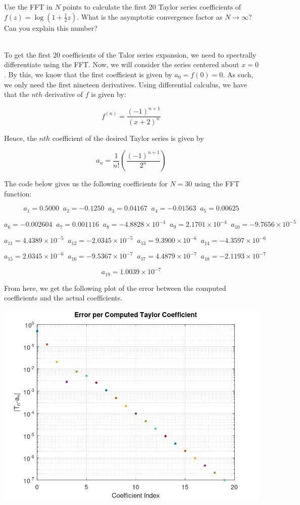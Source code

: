 Use the FFT in $N$ points to calculate the first 20 Taylor series coefficients of 
$f(z) = \log(1 + \frac12z)$. What is the asymptotic convergence factor as $N\rightarrow\infty$? 
Can you explain this number?\\

\begin{solution}\renewcommand{\qedsymbol}{}\ \\
    To get the first 20 coefficients of the Talor series expansion, we need to spectrally differentiate
    using the FFT. Now, we will consider the series centered about $x=0$. By this, we know that the
    first coefficient is given by $a_0=f(0)=0$. As such, we only need the first nineteen derivatives.
    Using differential calculus, we have that the $nth$ derivative of $f$ is given by:

    $$f^{(n)}=\frac{(-1)^{n+1}}{(x+2)^n}$$

    Hence, the $nth$ coefficient of the desired Taylor series is given by

    $$a_n=\frac{1}{n!}(\frac{(-1)^{n+1}}{2^n})$$

    The code below gives us the following coefficients for $N=30$ using the FFT function:

    $$a_1=0.5000\;\; a_2=-0.1250\;\; a_3=0.04167\;\; a_4=-0.01563\;\; a_5=0.00625$$

    $$a_6=-0.002604\;\; a_7=0.001116\;\; a_8=-4.8828\times10^{-4}\;\; a_9=2.1701\times10^{-4}\;\;
    a_{10}=-9.7656\times10^{-5}$$

    $$a_{11}=4.4389\times10^{-5}\;\; a_{12}=-2.0345\times10^{-5}\;\; a_{13}=9.3900\times10^{-6}\;\;
    a_{14}=-4.3597\times10^{-6}$$
    
    $$a_{15}=2.0345\times10^{-6}\;\; a_{16}=-9.5367\times10^{-7}\;\; a_{17}=4.4879\times10^{-7}\;\;
    a_{18}=-2.1193\times10^{-7}$$

    $$a_{19}=1.0039\times10^{-7}$$

    From here, we get the following plot of the error between the computed coefficients and the actual
    coefficients.

    \begin{center}
        \includegraphics[scale=0.45]{problem12_7.PNG}
    \end{center}


\end{solution}
